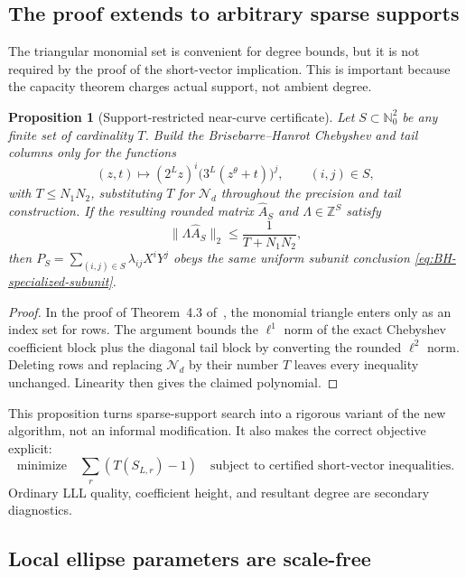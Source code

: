 \documentclass[11pt,oneside]{article}
\newtheorem{proposition}[theorem]{Proposition}
\theoremstyle{definition}
\theoremstyle{remark}
\newcommand{\Nzero}{\mathbb N_0}
\newcommand{\Z}{\mathbb Z}
\newcommand{\tht}{\theta}
\newcommand{\Nm}{\mathcal N}
\begin{document}
\subsection{The proof extends to arbitrary sparse supports}

The triangular monomial set is convenient for degree bounds, but it is not required by the proof of
the short-vector implication.  This is important because the capacity theorem charges actual
support, not ambient degree.

\begin{proposition}[Support-restricted near-curve certificate]
\label{prop:sparse-BH}
Let $S\subset\Nzero^2$ be any finite set of cardinality $T$.  Build the Brisebarre--Hanrot
Chebyshev and tail columns only for the functions
\[
  (z,t)\longmapsto (2^Lz)^i\bigl(3^L(z^\tht+t)\bigr)^j,
  \qquad (i,j)\in S,
\]
with $T\le N_1N_2$, substituting $T$ for $\Nm_d$ throughout the precision and tail
construction.  If the resulting rounded matrix $\widehat A_S$ and
$\Lambda\in\Z^S$ satisfy
\begin{equation}
  \|\Lambda\widehat A_S\|_2\le\frac1{T+N_1N_2},
  \label{eq:sparse-BH-norm}
\end{equation}
then $P_S=\sum_{(i,j)\in S}\lambda_{ij}X^iY^j$ obeys the same uniform subunit conclusion
\eqref{eq:BH-specialized-subunit}.
\end{proposition}

\begin{proof}
In the proof of Theorem~4.3 of~\cite{BrisebarreHanrot2026}, the monomial triangle enters only as an
index set for rows.  The argument bounds the $\ell^1$ norm of the exact Chebyshev coefficient block
plus the diagonal tail block by converting the rounded $\ell^2$ norm.  Deleting rows and replacing
$\Nm_d$ by their number $T$ leaves every inequality unchanged.  Linearity then gives the claimed
polynomial.
\end{proof}

This proposition turns sparse-support search into a rigorous variant of the new algorithm, not an
informal modification.  It also makes the correct objective explicit:
\begin{equation}
  \text{minimize}\quad
  \sum_{r}(T(S_{L,r})-1)
  \quad\text{subject to certified short-vector inequalities.}
  \label{eq:sparse-objective}
\end{equation}
Ordinary LLL quality, coefficient height, and resultant degree are secondary diagnostics.

\subsection{Local ellipse parameters are scale-free}
\end{document}
